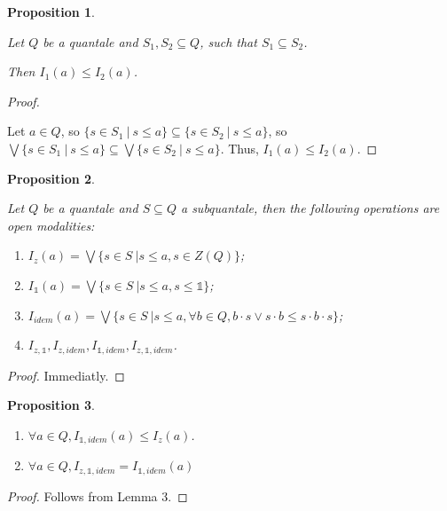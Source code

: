 \documentclass[a4paper]{article}
\newtheorem{prop}{Proposition}
\begin{document}
\begin{prop}
$ $

  Let $Q$ be a quantale and $S_1, S_2 \subseteq Q$, such that $S_1 \subseteq S_2$.

  Then $I_1 (a) \leq I_2 (a)$.
\end{prop}

\begin{proof}
$ $

  Let $a \in Q$, so $\{ s \in S_1 \: | \: s \leq a \} \subseteq \{ s \in S_2 \: | \: s \leq a \}$, so
  $\bigvee \{ s \in S_1 \: | \: s \leq a \} \subseteq \bigvee \{ s \in S_2 \: | \: s \leq a \}$.
  Thus, $I_1 (a) \leq I_2 (a)$.
\end{proof}

\begin{prop}
$ $

Let $Q$ be a quantale and $S \subseteq Q$ a subquantale, then the following operations are open modalities:

\begin{enumerate}
  \item $I_z (a) = \bigvee \{ s \in S \: | s \leq a, s \in Z(Q) \}$;
  \item $I_{\mathds{1}} (a) = \bigvee \{ s \in S \: | s \leq a, s \leq \mathds{1} \}$;
  \item $I_{idem} (a) = \bigvee \{ s \in S \: | s \leq a, \forall b \in Q, b \cdot s \vee s \cdot b \leq s \cdot b \cdot s\}$;
  \item $I_{z, \mathds{1}}, I_{z, idem}, I_{\mathds{1}, idem}, I_{z, \mathds{1}, idem}$.
\end{enumerate}
\end{prop}

\begin{proof}
  Immediatly.
\end{proof}

\begin{prop}
$ $

\begin{enumerate}
  \item $\forall a \in Q, I_{\mathds{1}, idem}(a) \leq I_z (a)$.
  \item $\forall a \in Q, I_{z, \mathds{1}, idem} = I_{\mathds{1}, idem}(a)$
\end{enumerate}

\end{prop}

\begin{proof}
  Follows from Lemma 3.
\end{proof}
\end{document}
